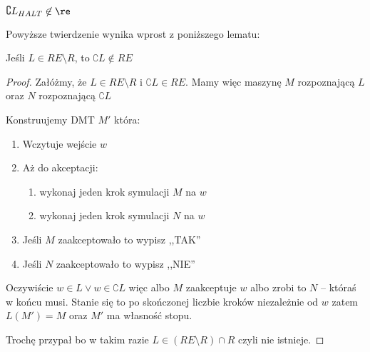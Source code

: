 \begin{theorem}
\(\complement L_{HALT} \not \in \re\)
\end{theorem}

Powyższe twierdzenie wynika wprost z poniższego lematu:

\begin{lemma}
    Jeśli \( L \in RE \setminus R \), to \( \complement{L} \not \in RE\) 
\end{lemma}
\begin{proof}
    Załóżmy, że \( L \in RE \setminus R \) i \( \complement{L} \in RE\). 
    Mamy więc maszynę \( M \) rozpoznającą \( L \) oraz \( N \) rozpoznającą \( \complement{L} \)
    
    Konstruujemy DMT \( M' \) która:
    \begin{enumerate}
        \item Wczytuje wejście \( w \)
        \item Aż do akceptacji:
        \begin{enumerate}
            \item wykonaj jeden krok symulacji \( M \) na \( w \)
            \item wykonaj jeden krok symulacji \( N \) na \( w \)
        \end{enumerate}
        \item Jeśli \( M \) zaakceptowało to wypisz ,,TAK''
        \item Jeśli \( N \) zaakceptowało to wypisz ,,NIE''
    \end{enumerate}
    
    Oczywiście \( w \in L \lor w \in \complement{L} \) więc albo \( M \) zaakceptuje \( w \) albo zrobi to \( N \) -- któraś w końcu musi.
    Stanie się to po skończonej liczbie kroków niezależnie od \( w \) zatem \( L(M') = M \) oraz \( M' \) ma własność stopu.
    
    Trochę przypał bo w takim razie \( L \in (RE \setminus R) \cap R \) czyli nie istnieje.
    
\end{proof}